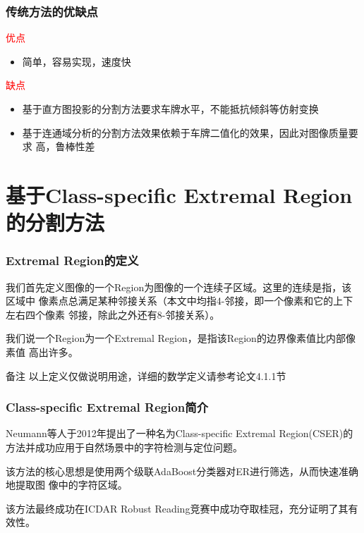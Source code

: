 \documentclass[UTF8]{beamer}
\begin{document}
\begin{frame}
  \frametitle{传统方法的优缺点}

  \textcolor{red}{优点}
  \begin{itemize}
    \item 简单，容易实现，速度快
  \end{itemize}

  \textcolor{red}{缺点}
  \begin{itemize}
    \item 基于直方图投影的分割方法要求车牌水平，不能抵抗倾斜等仿射变换
    \item 基于连通域分析的分割方法效果依赖于车牌二值化的效果，因此对图像质量要求
      高，鲁棒性差
  \end{itemize}
\end{frame}

\section{基于Class-specific Extremal Region的分割方法}

\begin{frame}
  \frametitle{Extremal Region的定义}
  \begin{definition}
    我们首先定义图像的一个Region为图像的一个连续子区域。这里的连续是指，该区域中
    像素点总满足某种邻接关系（本文中均指4-邻接，即一个像素和它的上下左右四个像素
    邻接，除此之外还有8-邻接关系）。
  \end{definition}

  \begin{definition}
    我们说一个Region为一个Extremal Region，是指该Region的边界像素值比内部像素值
    高出许多。
  \end{definition}

  \begin{block}{备注}
    以上定义仅做说明用途，详细的数学定义请参考论文4.1.1节
  \end{block}
\end{frame}

\begin{frame}
  \frametitle{Class-specific Extremal Region简介}
  
  Neumann等人于2012年提出了一种\cite{Neumann:2012ik}名为Class-specific
  Extremal Region(CSER)的方法并成功应用于自然场景中的字符检测与定位问题。

  该方法的核心思想是使用两个级联AdaBoost分类器对ER进行筛选，从而快速准确地提取图
  像中的字符区域。

  该方法最终成功在ICDAR Robust Reading竞赛中成功夺取桂冠，充分证明了其有效性。
\end{frame}
\end{document}
